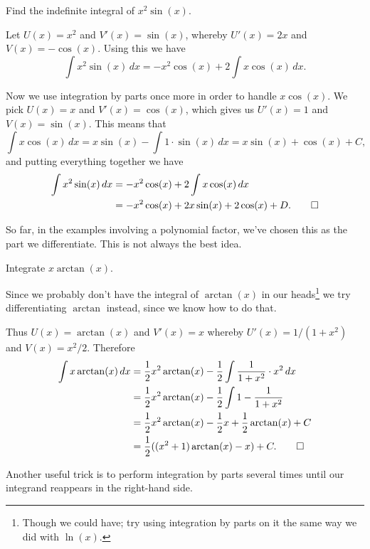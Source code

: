 \begin{example}
	Find the indefinite integral of $x^2 \sin(x)$.

	Let $U(x) = x^2$ and $V'(x) = \sin(x)$, whereby $U'(x) = 2 x$ and $V(x) = - \cos(x)$.
	Using this we have
	\[
		\int x^2 \sin(x) \, d x = - x^2 \cos(x)  + 2 \int x \cos(x) \, d x.
	\]

	\noindent
	Now we use integration by parts once more in order to handle $x \cos(x)$.
	We pick $U(x) = x$ and $V'(x) = \cos(x)$, which gives us $U'(x) = 1$ and $V(x) = \sin(x)$.
	This means that
	\[
		\int x \cos(x) \, d x = x \sin(x) - \int 1 \cdot \sin(x) \, d x = x \sin(x) + \cos(x) + C,
	\]
	and putting everything together we have
	\begin{align*}
		\int x^2 \sin(x) \, d x &= - x^2 \cos(x)  + 2 \int x \cos(x) \, d x \\
		                        &= - x^2 \cos(x) + 2 x \sin(x) + 2 \cos(x) + D. \qedhere
	\end{align*}
\end{example}

\noindent
So far, in the examples involving a polynomial factor, we've chosen this as the part we differentiate.
This is not always the best idea.

\begin{example}
	Integrate $x \arctan(x)$.

	Since we probably don't have the integral of $\arctan(x)$ in our heads\footnote{Though we could have; try using integration by parts on it the same way we did with $\ln(x)$.} we try differentiating $\arctan$ instead, since we know how to do that.

	Thus $U(x) = \arctan(x)$ and $V'(x) = x$ whereby $U'(x) = 1 / (1 + x^2)$ and $V(x) = x^2 / 2$.
	Therefore
	\begin{align*}
		\int x \arctan(x) \, d x &= \frac{1}{2} x^2 \arctan(x) - \frac{1}{2} \int \frac{1}{1 + x^2} \cdot x^2 \, d x \\
		                         &= \frac{1}{2} x^2 \arctan(x) - \frac{1}{2} \int 1 - \frac{1}{1 + x^2} \\
		                         &= \frac{1}{2} x^2 \arctan(x) - \frac{1}{2} x + \frac{1}{2} \arctan(x) + C \\
														 &= \frac{1}{2} ((x^2 + 1) \arctan(x) - x) + C. \qedhere
	\end{align*}
\end{example}

\noindent
Another useful trick is to perform integration by parts several times until our integrand reappears in the right-hand side.

